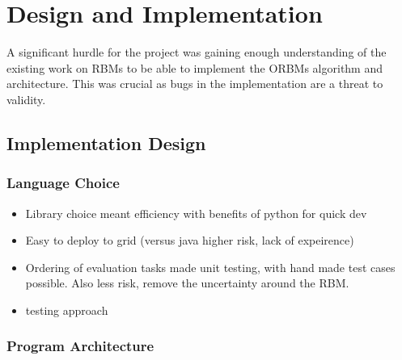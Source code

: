 \chapter{Design and Implementation}\label{C:work}

A significant hurdle for the project was gaining enough understanding of the existing work on RBMs to be able to implement the ORBMs algorithm and architecture. This was crucial as bugs in the implementation are a threat to validity.




\section{Implementation Design}

\subsection{Language Choice}
\begin{itemize}
  \item Library choice meant efficiency with benefits of python for quick dev
  \item Easy to deploy to grid (versus java higher risk, lack of expeirence)
  \item Ordering of evaluation tasks made unit testing, with hand made test cases possible. Also less risk, remove the uncertainty around the RBM.
  \item testing approach
\end{itemize}


\subsection{Program Architecture}

